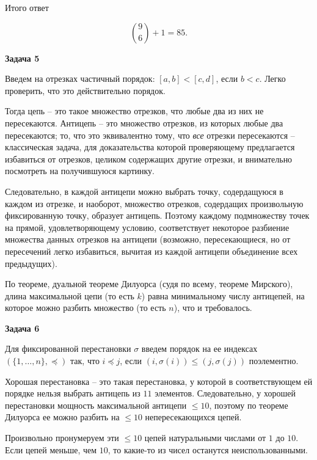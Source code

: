 		Итого ответ

		\begin{equation*}
			\binom{9}{6} + 1 = 85.
		\end{equation*}


	\begin{center}
    \textbf{Задача 5}
\end{center}
		Введем на отрезках частичный порядок: $[a, b] < [c, d]$, если $b < c$. Легко проверить, что это действительно порядок.

		Тогда цепь -- это такое множество отрезков, что любые два из них не пересекаются. Антицепь -- это множество отрезков, из которых любые два пересекаются; то, что это эквивалентно тому, что \textit{все} отрезки пересекаются -- классическая задача, для доказательства которой проверяющему предлагается избавиться от отрезков, целиком содержащих другие отрезки, и внимательно посмотреть на получившуюся картинку.

		Следовательно, в каждой антицепи можно выбрать точку, содердащуюся в каждом из отрезке, и наоборот, множество отрезков, содердащих произвольную фиксированную точку, образует антицепь. Поэтому каждому подмножеству точек на прямой, удовлетворяющему условию, соответствует некоторое разбиение множества данных отрезков на антицепи (возможно, пересекающиеся, но от пересечений легко избавиться, вычитая из каждой антицепи объединение всех предыдущих).

		По теореме, дуальной теореме Дилуорса (судя по всему, теореме Мирского), длина максимальной цепи (то есть $k$) равна минимальному числу антицепей, на которое можно разбить множество (то есть $n$), что и требовалось.


	\begin{center}
    \textbf{Задача 6}
\end{center}
		Для фиксированной перестановки $\sigma$ введем порядок на ее индексах $(\{1, \dots, n\}, \preceq)$ так, что $i \preceq j$, если $(i, \sigma(i)) \le (j, \sigma(j))$ поэлементно.

		Хорошая перестановка -- это такая перестановка, у которой в соответствующем ей порядке нельзя выбрать антицепь из $11$ элементов. Следовательно, у хорошей перестановки мощность максимальной антицепи $\le 10$, поэтому по теореме Дилуорса ее можно разбить на $\le 10$ непересекающихся цепей.

		Произвольно пронумеруем эти $\le 10$ цепей натуральными числами от $1$ до $10$. Если цепей меньше, чем $10$, то какие-то из чисел останутся неиспользованными.

